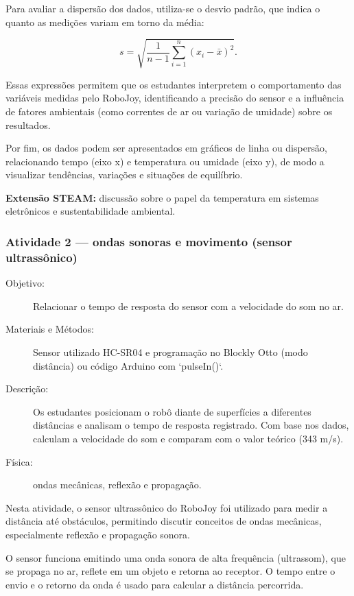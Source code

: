 \documentclass[portuguese]{textolivre}
\begin{document}
Para avaliar a dispersão dos dados, utiliza-se o desvio padrão, que indica o quanto as medições variam em torno da média:

\begin{equation}
	s = \sqrt{\frac{1}{n-1} \sum_{i=1}^{n} (x_i - \bar{x})^2} .
\end{equation}

Essas expressões permitem que os estudantes interpretem o comportamento das variáveis medidas pelo RoboJoy, identificando a precisão do sensor e a influência de fatores ambientais (como correntes de ar ou variação de umidade) sobre os resultados.

Por fim, os dados podem ser apresentados em gráficos de linha ou dispersão, relacionando tempo (eixo x) e temperatura ou umidade (eixo y), de modo a visualizar tendências, variações e situações de equilíbrio.

\textbf{Extensão STEAM:} discussão sobre o papel da temperatura em sistemas eletrônicos e sustentabilidade ambiental.


\subsubsection{Atividade 2 — ondas sonoras e movimento (sensor ultrassônico)}

\begin{description}
    \item[Objetivo:] Relacionar o tempo de resposta do sensor com a velocidade do som no ar.
    \item[Materiais e Métodos:] Sensor utilizado HC-SR04 e programação no Blockly Otto (modo distância) ou código Arduino com `pulseIn()`.
    \item[Descrição:] Os estudantes posicionam o robô diante de superfícies a diferentes distâncias e analisam o tempo de resposta registrado. Com base nos dados, calculam a velocidade do som e comparam com o valor teórico (343 m/s).
    \item[Física:] ondas mecânicas, reflexão e propagação.
\end{description}


Nesta atividade, o sensor ultrassônico do RoboJoy foi utilizado para medir a distância até obstáculos, permitindo discutir conceitos de ondas mecânicas, especialmente reflexão e propagação sonora.

O sensor funciona emitindo uma onda sonora de alta frequência (ultrassom), que se propaga no ar, reflete em um objeto e retorna ao receptor. O tempo entre o envio e o retorno da onda é usado para calcular a distância percorrida.
\end{document}
